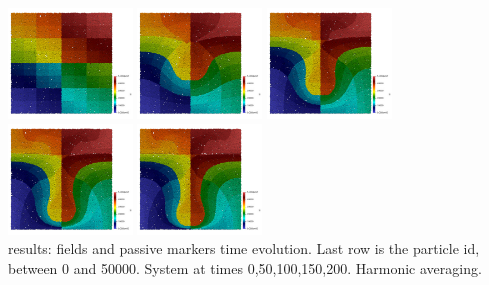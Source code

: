 \begin{center}
\includegraphics[width=3.3cm]{images/stokes_sphere_fs2D/harm_6_1/swarm_id0000}
\includegraphics[width=3.3cm]{images/stokes_sphere_fs2D/harm_6_1/swarm_id0050}
\includegraphics[width=3.3cm]{images/stokes_sphere_fs2D/harm_6_1/swarm_id0100}
\includegraphics[width=3.3cm]{images/stokes_sphere_fs2D/harm_6_1/swarm_id0150}
\includegraphics[width=3.3cm]{images/stokes_sphere_fs2D/harm_6_1/swarm_id0200}\\
{\captionfont \aspect results: fields and passive markers time evolution. 
Last row is the particle id, between 0 and 50000. 
System at times 0,50,100,150,200. Harmonic averaging.}
\end{center}



